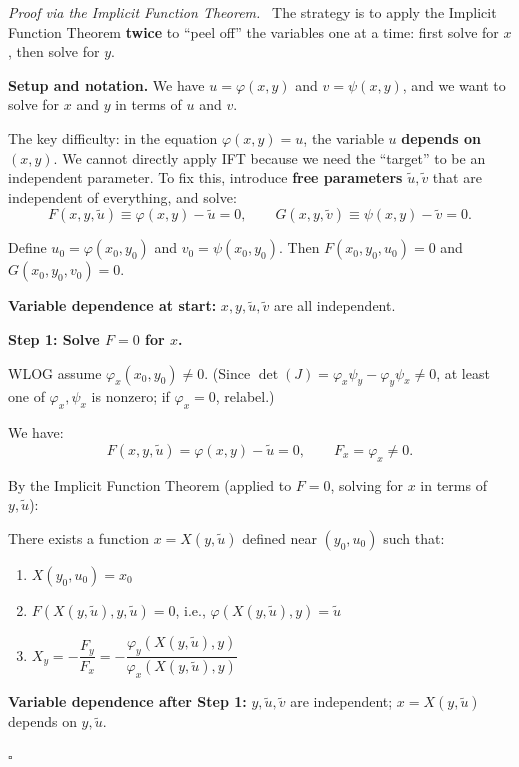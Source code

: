 \documentclass[11pt]{report}
\renewenvironment{proof}[1][Proof]{\par\noindent\textit{#1.}\ }{\hfill$\square$\par\medskip}
\begin{document}
\begin{proof}[Proof via the Implicit Function Theorem]
The strategy is to apply the Implicit Function Theorem \textbf{twice} to ``peel off'' the variables one at a time: first solve for $x$, then solve for $y$.

\textbf{Setup and notation.} We have $u = \varphi(x,y)$ and $v = \psi(x,y)$, and we want to solve for $x$ and $y$ in terms of $u$ and $v$.

The key difficulty: in the equation $\varphi(x,y) = u$, the variable $u$ \textbf{depends on} $(x,y)$. We cannot directly apply IFT because we need the ``target'' to be an independent parameter. To fix this, introduce \textbf{free parameters} $\tilde{u}, \tilde{v}$ that are independent of everything, and solve:
\[
F(x, y, \tilde{u}) \equiv \varphi(x, y) - \tilde{u} = 0, \qquad G(x, y, \tilde{v}) \equiv \psi(x, y) - \tilde{v} = 0.
\]

Define $u_0 = \varphi(x_0, y_0)$ and $v_0 = \psi(x_0, y_0)$. Then $F(x_0, y_0, u_0) = 0$ and $G(x_0, y_0, v_0) = 0$.

\textbf{Variable dependence at start:} $x, y, \tilde{u}, \tilde{v}$ are all independent.

\medskip
\textbf{Step 1: Solve $F = 0$ for $x$.}

WLOG assume $\varphi_x(x_0, y_0) \neq 0$. (Since $\det(J) = \varphi_x \psi_y - \varphi_y \psi_x \neq 0$, at least one of $\varphi_x, \psi_x$ is nonzero; if $\varphi_x = 0$, relabel.)

We have:
\[
F(x, y, \tilde{u}) = \varphi(x, y) - \tilde{u} = 0, \qquad F_x = \varphi_x \neq 0.
\]

By the Implicit Function Theorem (applied to $F = 0$, solving for $x$ in terms of $y, \tilde{u}$):

There exists a function $x = X(y, \tilde{u})$ defined near $(y_0, u_0)$ such that:
\begin{enumerate}[label=(\roman*), itemsep=2pt]
    \item $X(y_0, u_0) = x_0$
    \item $F(X(y, \tilde{u}), y, \tilde{u}) = 0$, i.e., $\varphi(X(y, \tilde{u}), y) = \tilde{u}$
    \item $X_y = -\dfrac{F_y}{F_x} = -\dfrac{\varphi_y(X(y,\tilde{u}), y)}{\varphi_x(X(y,\tilde{u}), y)}$
\end{enumerate}

\textbf{Variable dependence after Step 1:} $y, \tilde{u}, \tilde{v}$ are independent; $x = X(y, \tilde{u})$ depends on $y, \tilde{u}$.


\end{proof}
\end{document}
